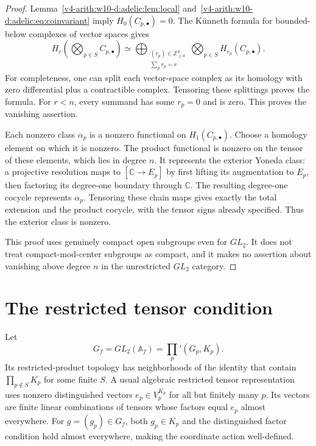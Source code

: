 \begin{proof}
Lemma~\ref{v4-arith:w10-d:adelic:lem:local} and~\eqref{v4-arith:w10-d:adelic:eq:coinvariant} imply
$H_0(C_{p,\bullet})=0$. The K\"unneth formula for bounded-below complexes
of vector spaces gives
\[
 H_r\left(\bigotimes_{p\in S}C_{p,\bullet}\right)
 \simeq\bigoplus_{\substack{(r_p)\in\mathbb Z_{\ge0}^{S}\\\sum_pr_p=r}}
       \bigotimes_{p\in S}H_{r_p}(C_{p,\bullet}).
\]
For completeness, one can split each vector-space complex as its homology
with zero differential plus a contractible complex. Tensoring these
splittings proves the formula. For $r<n$, every summand has some $r_p=0$
and is zero. This proves the vanishing assertion.

Each nonzero class $\alpha_p$ is a nonzero functional on
$H_1(C_{p,\bullet})$. Choose a homology element on which it is nonzero.
The product functional is nonzero on the tensor of these elements,
which lies in degree $n$. It represents the exterior Yoneda class:
a projective resolution maps to $[\mathbb C\to E_p]$ by first lifting its
augmentation to $E_p$, then factoring its degree-one boundary through
$\mathbb C$. The resulting degree-one cocycle represents $\alpha_p$.
Tensoring these chain maps gives exactly the total extension and the
product cocycle, with the tensor signs already specified.
Thus the exterior class is nonzero.

This proof uses genuinely compact open subgroups even for $GL_2$.
It does not treat compact-mod-center subgroups as compact, and it makes
no assertion about vanishing above degree $n$ in the unrestricted
$GL_2$ category.
\end{proof}

\section{The restricted tensor condition}

Let
\[
 G_f=GL_2(\mathbb A_f)=\prod_p'(G_p,K_p).
\]
Its restricted-product topology has neighborhoods of the identity that
contain $\prod_{p\notin S}K_p$ for some finite $S$. A usual algebraic
restricted tensor representation uses nonzero distinguished vectors
$e_p\in V_p^{K_p}$ for all but finitely many $p$. Its vectors are finite
linear combinations of tensors whose factors equal $e_p$ almost
everywhere. For $g=(g_p)\in G_f$, both $g_p\in K_p$ and the distinguished
factor condition hold almost everywhere, making the coordinate action
well-defined.

